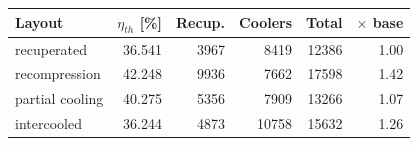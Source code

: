 \begin{tabular}{@{}lrrrrr@{}}
\toprule
Layout & $\eta_{th}$ [\%] & Recup. & Coolers & Total & $\times$ base \\
\midrule
recuperated & 36.541 & 3967 & 8419 & 12386 & 1.00 \\
recompression & 42.248 & 9936 & 7662 & 17598 & 1.42 \\
partial cooling & 40.275 & 5356 & 7909 & 13266 & 1.07 \\
intercooled & 36.244 & 4873 & 10758 & 15632 & 1.26 \\
\bottomrule
\end{tabular}
